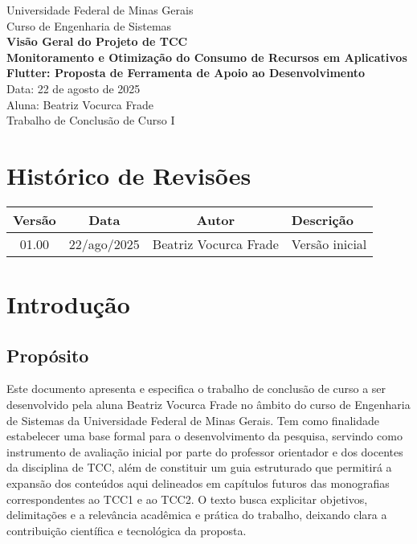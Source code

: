 \documentclass[12pt,a4paper]{article}
\begin{document}
\begin{center}
\Large
Universidade Federal de Minas Gerais \\
Curso de Engenharia de Sistemas \\[3cm]

\textbf{\LARGE Visão Geral do Projeto de TCC} \\[1cm]

\textbf{Monitoramento e Otimização do Consumo de Recursos em Aplicativos Flutter: Proposta de Ferramenta de Apoio ao Desenvolvimento} \\[4cm]

Data: 22 de agosto de 2025 \\[4cm]

Aluna: Beatriz Vocurca Frade \\[3cm]

Trabalho de Conclusão de Curso I
\end{center}

\newpage

\section*{Histórico de Revisões}

\begin{longtable}{|c|c|c|p{7cm}|}
\hline
\textbf{Versão} & \textbf{Data} & \textbf{Autor} & \textbf{Descrição} \\ \hline
01.00 & 22/ago/2025 & Beatriz Vocurca Frade & Versão inicial \\ \hline
\end{longtable}

\newpage

\tableofcontents
\newpage

\section{Introdução}

\subsection{Propósito}
Este documento apresenta e especifica o trabalho de conclusão de curso a ser desenvolvido pela aluna Beatriz Vocurca Frade no âmbito do curso de Engenharia de Sistemas da Universidade Federal de Minas Gerais. Tem como finalidade estabelecer uma base formal para o desenvolvimento da pesquisa, servindo como instrumento de avaliação inicial por parte do professor orientador e dos docentes da disciplina de TCC, além de constituir um guia estruturado que permitirá a expansão dos conteúdos aqui delineados em capítulos futuros das monografias correspondentes ao TCC1 e ao TCC2. O texto busca explicitar objetivos, delimitações e a relevância acadêmica e prática do trabalho, deixando clara a contribuição científica e tecnológica da proposta.
\end{document}

